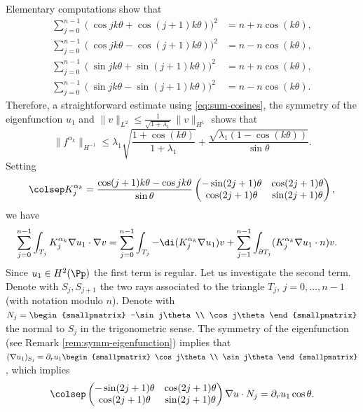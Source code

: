 Elementary computations show that
\begin{equation}
\begin{aligned}\label{eq:sum-cosines}
\sum_{j=0}^{n-1} (\cos jk\theta+\cos(j+1)k\theta))^2 &= n+n\cos (k\theta),\\
\sum_{j=0}^{n-1} (\cos jk\theta-\cos(j+1)k\theta))^2 &= n-n\cos (k\theta),\\
\sum_{j=0}^{n-1} (\sin jk\theta+\sin(j+1)k\theta))^2 &= n+n\cos (k\theta),\\
\sum_{j=0}^{n-1} (\sin jk\theta-\sin(j+1)k\theta))^2 &= n-n\cos (k\theta).
\end{aligned}
\end{equation}
Therefore, a straightforward estimate using \eqref{eq:sum-cosines}, the symmetry of the eigenfunction $u_1$ and $\|v\|_{L^2} \leq \frac{1}{\sqrt{1+\lambda_1}}\,\|v\|_{H^1}$ shows that
\[
\|f^{\alpha_k}\|_{H^{-1}} \leq \lambda_1 \sqrt{\frac{1+\cos(k\theta)}{1+\lambda_1}} +\frac{\sqrt{\lambda_1(1-\cos(k\theta))}}{\sin \theta}.
\]
Setting
\[\colsep
K_j^{\alpha_k} = \frac{\cos(j+1)k\theta-\cos jk\theta}{\sin \theta} \begin{pmatrix}
-\sin (2j+1)\theta & \cos (2j+1) \theta \\
\cos(2j+1)\theta & \sin (2j+1)\theta
\end{pmatrix},
\]
we have
\begin{align*}
\sum_{j=0}^{n-1} \int_{T_j} K_j^{\alpha_k}\nabla u_1 \cdot \nabla v & = \sum_{j=0}^{n-1} \int_{T_j} -\di (K_j^{\alpha_k}\nabla u_1) v + \sum_{j=1}^{n-1} \int_{\partial T_j} (K_j^{\alpha_k}\nabla u_1 \cdot n) v.
\end{align*}
Since $u_1 \in H^2(\Pp)$ the first term is regular. Let us investigate the second term. Denote with $S_j, S_{j+1}$ the two rays associated to the triangle $T_j$, $j=0,\dots,n-1$ (with notation modulo $n$). Denote with $N_j=\begin{smallpmatrix}
-\sin j\theta \\ \cos j\theta
\end{smallpmatrix}$ the normal to $S_j$ in the trigonometric sense.
The symmetry of the eigenfunction (see Remark \ref{rem:symm-eigenfunction}) implies that $(\nabla u_1)_{S_j} = \partial_r u_1 \begin{smallpmatrix}
\cos j\theta \\ \sin j\theta
\end{smallpmatrix}$, which implies
\[\colsep
\begin{pmatrix}
-\sin(2j+1)\theta & \cos(2j+1)\theta \\
\cos(2j+1)\theta & \sin (2j+1)\theta
\end{pmatrix}
\nabla u \cdot N_j = \partial_r u_1 \cos \theta.
\]
